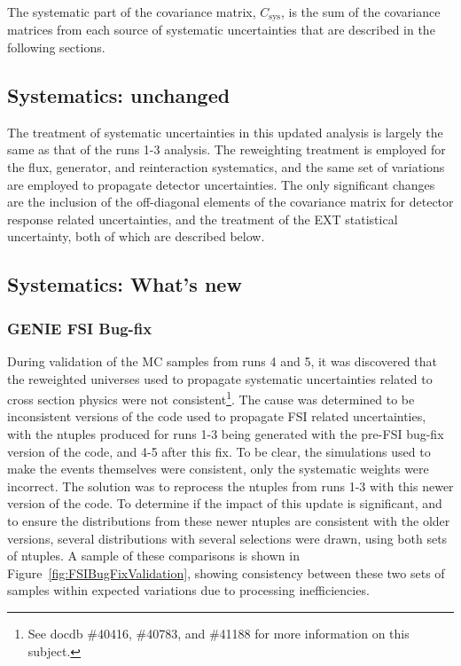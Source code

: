 The systematic part of the covariance matrix, $C_\text{sys}$, is the sum of the covariance matrices from each source of systematic uncertainties that are described in the following sections. 

\subsection{Systematics: unchanged}

The treatment of systematic uncertainties in this updated analysis is largely the same as that of the runs 1-3 analysis. The reweighting treatment is employed for the flux, generator, and reinteraction systematics, and the same set of variations are employed to propagate detector uncertainties. The only significant changes are the inclusion of the off-diagonal elements of the covariance matrix for detector response related uncertainties, and the treatment of the EXT statistical uncertainty, both of which are described below.

\subsection{Systematics: What's new}

\subsubsection{GENIE FSI Bug-fix}
During validation of the MC samples from runs 4 and 5, it was discovered that the reweighted universes used to propagate systematic uncertainties related to cross section physics were not consistent\footnote{See docdb \#40416, \#40783, and \#41188 for more information on this subject.}. The cause was determined to be inconsistent versions of the code used to propagate FSI related uncertainties, with the ntuples produced for runs 1-3 being generated with the pre-FSI bug-fix version of the code, and 4-5 after this fix. To be clear, the simulations used to make the events themselves were consistent, only the systematic weights were incorrect. The solution was to reprocess the ntuples from runs 1-3 with this newer version of the code. To determine if the impact of this update is significant, and to ensure the distributions from these newer ntuples are consistent with the older versions, several distributions with several selections were drawn, using both sets of ntuples. A sample of these comparisons is shown in Figure~\ref{fig:FSIBugFixValidation}, showing consistency between these two sets of samples within expected variations due to processing inefficiencies.

